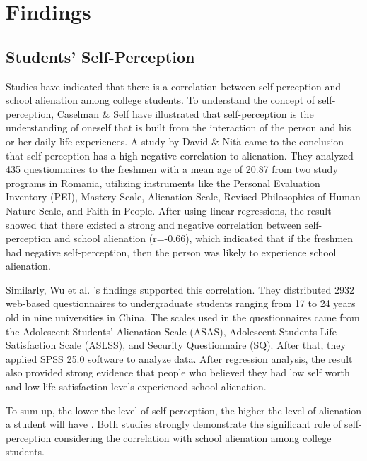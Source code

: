 \documentclass{scupi_apa_thesis}
\begin{document}
\section{Findings}
\subsection{Students' Self-Perception }
\par
Studies have indicated that there is a correlation between self-perception and school alienation among college students. 
To understand the concept of self-perception, Caselman \& Self \citeyear{caselman2007adolescent} have illustrated that self-perception is the understanding of oneself that is built from the interaction of the person and his or her daily life experiences. 
A study by David \& Nită \citeyear{david2014adjustment} came to the conclusion that self-perception has a high negative correlation to alienation. 
They analyzed 435 questionnaires to the freshmen with a mean age of 20.87 from two study programs in Romania, utilizing instruments like the Personal Evaluation Inventory (PEI), 
Mastery Scale, Alienation Scale, Revised Philosophies of Human Nature Scale, and Faith in People. 
After using linear regressions, the result showed that there existed a strong and negative correlation between self-perception and school alienation (r=-0.66), which indicated that if the freshmen had negative self-perception, then the person was likely to experience school alienation. 
\par
Similarly, Wu et al. \citeyear{wu2024sense}'s findings supported this correlation. 
They distributed 2932 web-based questionnaires to undergraduate students ranging from 17 to 24 years old in nine universities in China. 
The scales used in the questionnaires came from the Adolescent Students' Alienation Scale (ASAS), Adolescent Students Life Satisfaction Scale (ASLSS), and Security Questionnaire (SQ). 
After that, they applied SPSS 25.0 software to analyze data. 
After regression analysis, the result also provided strong evidence that people who believed they had low self worth and low life satisfaction levels experienced school alienation. 
\par
To sum up, the lower the level of self-perception, the higher the level of alienation a student will have \cite{david2014adjustment}. 
Both studies strongly demonstrate the significant role of self-perception considering the correlation with school alienation among college students.
\end{document}
